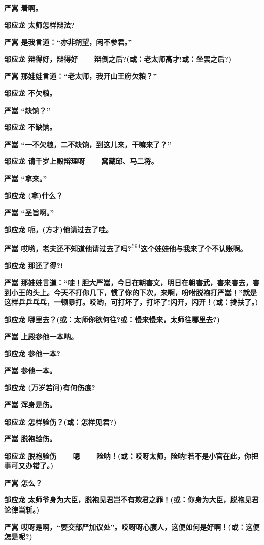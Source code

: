 \textbf{严嵩 着啊。}

\textbf{邹应龙 太师怎样辩法?}

\textbf{严嵩 是我言道：``亦非朔望，闲不参君。''}

\textbf{邹应龙
辩得好，辩得好------辩倒之后?(或：老太师高才!或：坐罢之后?)}

\textbf{严嵩 那娃娃言道：``老太师，我开山王府欠粮？''}

\textbf{邹应龙 不欠粮。}

\textbf{严嵩 ``缺饷？''}

\textbf{邹应龙 不缺饷。}

\textbf{严嵩 ``一不欠粮，二不缺饷，到这儿来，干嘛来了？''}

\textbf{邹应龙 请千岁上殿辩理呀------窝藏邱、马二将。}

\textbf{严嵩 ``拿来。''}

\textbf{邹应龙 (拿)什么？}

\textbf{严嵩 ``圣旨啊。''}

\textbf{邹应龙 呃，(方才)他请过去了哇。}

\textbf{严嵩
哎哟，老夫还不知道他请过去了吗?}\protect\hyperlink{fn594}{\textsuperscript{594}}\textbf{这个娃娃他与我来了个不认账啊。}

\textbf{邹应龙 那还了得?!}

\textbf{严嵩
那娃娃言道：``唗！胆大严嵩，今日在朝害文，明日在朝害武，害来害去，害到小王的头上。今天不打你几下，惯了你的下次，来啊，吩咐脱袍打严嵩！''就是这样乒乒乓乓，一顿暴打。哎哟，可打坏了，打坏了!闪开，闪开！(或：搀扶了。)}

\textbf{邹应龙 哪里去？(或：太师你欲何往?或：慢来慢来，太师往哪里去?)}

\textbf{严嵩 上殿参他一本呐。}

\textbf{邹应龙 参他一本?}

\textbf{严嵩 参他一本。}

\textbf{邹应龙 (万岁若问)有何伤痕?}

\textbf{严嵩 浑身是伤。}

\textbf{邹应龙 怎样验伤？(或：怎样见君?)}

\textbf{严嵩 脱袍验伤。}

\textbf{邹应龙
脱袍验伤------嗯------险呐！(或：哎呀太师，险呐!若不是小官在此，你把事可又办错了。)}

\textbf{严嵩 怎么？}

\textbf{邹应龙
太师爷身为大臣，脱袍见君岂不有欺君之罪！(或：你身为大臣，脱袍见君论律当斩。)}

\textbf{严嵩
哎呀是啊，``要交部严加议处''。哎呀呀心腹人，这便如何是好啊！(或：这便怎是呢?)}

